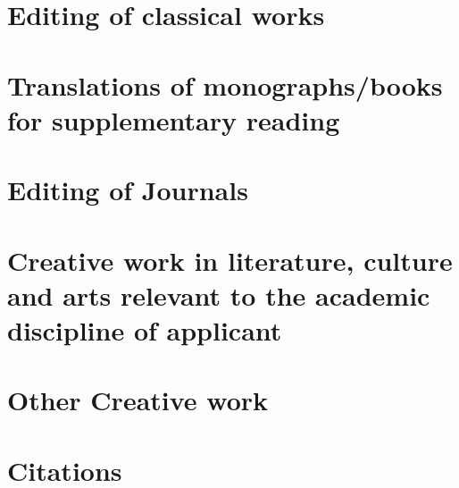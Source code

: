 		
		\section{Editing of classical works}
				
		
		
		\section{Translations of monographs/books for supplementary reading}
				
		
		\section{Editing of Journals }
				
		
		\section{Creative work in literature, culture and arts  relevant to the academic discipline of applicant }
		
				\label{GreenGuardian}
		
		
		\section{Other Creative work}
			
		
		
		\section{Citations}
				
		
		
		
	